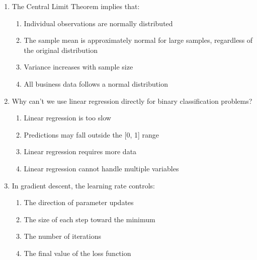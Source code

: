 \documentclass[10pt, oneside]{article}
\begin{document}
\begin{enumerate}
    \item The Central Limit Theorem implies that:
    \begin{enumerate}
        \item Individual observations are normally distributed
        \item The sample mean is approximately normal for large samples, regardless of the original distribution
        \item Variance increases with sample size
        \item All business data follows a normal distribution
    \end{enumerate}

    \item Why can't we use linear regression directly for binary classification problems?
    \begin{enumerate}
        \item Linear regression is too slow
        \item Predictions may fall outside the [0, 1] range
        \item Linear regression requires more data
        \item Linear regression cannot handle multiple variables
    \end{enumerate}

    \item In gradient descent, the learning rate controls:
    \begin{enumerate}
        \item The direction of parameter updates
        \item The size of each step toward the minimum
        \item The number of iterations
        \item The final value of the loss function
    \end{enumerate}
\end{enumerate}
\end{document}
